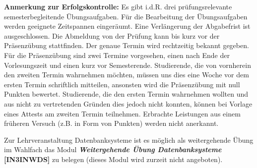 \begin{course}
\begin{remarks}\textbf{Anmerkung zur Erfolgskontrolle:} \newline
Es gibt i.d.R. drei prüfungsrelevante semesterbegleitende Übungsaufgaben. Für die Bearbeitung der Übungsaufgaben werden geeignete Zeitspannen eingeräumt. Eine Verlängerung der Abgabefrist ist ausgeschlossen.\newline
Die Abmeldung von der Prüfung kann bis kurz vor der Präsenzübung stattfinden. Der genaue Termin wird rechtzeitig bekannt gegeben.\newline
Für die Präsenzübung sind zwei Termine vorgesehen, einen nach Ende der Vorlesungszeit und einen kurz vor Semesterende. Studierende, die von vornherein den zweiten Termin wahrnehmen möchten, müssen uns dies eine Woche vor dem ersten Termin schriftlich mitteilen, ansonsten wird die Präsenzübung mit null Punkten bewertet. Studierende, die den ersten Termin wahrnehmen wollten und aus nicht zu vertretenden Gründen dies jedoch nicht konnten, können bei Vorlage eines Attests am zweiten Termin teilnehmen.\newline
Erbrachte Leistungen aus einem früheren Versuch (z.B. in Form von Punkten) werden nicht anerkannt.

 

Zur Lehrveranstaltung Datenbanksysteme ist es möglich als weitergehende Übung im Wahlfach das Modul \textbf{\emph{Weitergehende Übung Datenbanksysteme} [IN3INWDS]} zu belegen (dieses Modul wird zurzeit nicht angeboten).

\end{remarks}

\end{course}